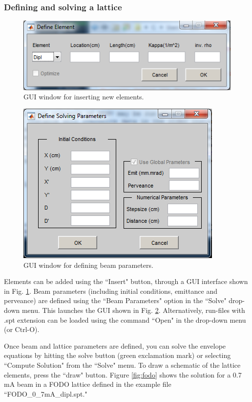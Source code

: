 \documentclass[../menv_main.tex]{subfiles}
\begin{document}
\subsubsection{Defining and solving a lattice}



\begin{figure}
\centering
\includegraphics{figures/defElement_window.png}
\caption{GUI window for inserting new elements.}
\label{fig:defelement}
\end{figure}

\begin{figure}
\centering
\includegraphics{figures/defparam_window.png}
\caption{GUI window for defining beam parameters.}
\label{fig:defparam}
\end{figure}


Elements can be added using the ``Insert" button, through a GUI interface shown in Fig. \ref{fig:defelement}. Beam parameters (including initial conditions, emittance and perveance) are defined using the ``Beam Parameters" option in the ``Solve" drop-down menu. This launches the GUI shown in Fig. \ref{fig:defparam}. Alternatively, run-files with .spt extension can be loaded using the command ``Open" in the drop-down menu (or Ctrl-O). 

Once beam and lattice parameters are defined, you can solve the envelope equations by hitting the solve button (green exclamation mark) or selecting ``Compute Solution" from the ``Solve" menu. To draw a schematic of the lattice elements, press the ``draw" button. 
Figure \ref{fig:fodo} shows the solution for a 0.7 mA beam in a FODO lattice defined in the example file ``FODO\_0\_7mA\_dipl.spt." 
\end{document}
